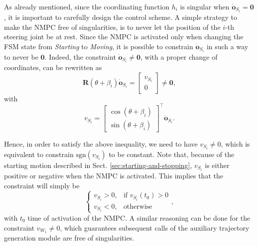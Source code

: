 As already mentioned, since the coordinating function $h_i$ is singular when $\dot{\bm{o}}_{S_i}=\bm{0}$, it is important to carefully design the control scheme. A simple strategy to make the NMPC free of singularities, is to never let the position of the $i$-th steering joint be at rest. Since the NMPC is activated only when changing the FSM state from \textit{Starting} to \textit{Moving}, it is possible to constrain $\dot{\bm{o}}_{S_i}$ in such a way to never be $\bm{0}$. Indeed, the constraint $\dot{\bm{o}}_{S_i} \ne \bm{0}$, with a proper change of coordinates, can be rewritten as
\begin{equation*}
    \bm{R}(\theta + \beta_i) \dot{\bm{o}}_{S_i} =
    \begin{bmatrix}
        v_{S_i} \\ 0
    \end{bmatrix} \ne \bm{0},
\end{equation*}
with
\begin{equation*}
    v_{S_i} = 
    \begin{bmatrix}
        \cos(\theta + \beta_i) \\
        \sin(\theta + \beta_i)
    \end{bmatrix}^\top \dot{\bm{o}}_{S_i}.
\end{equation*}

Hence, in order to satisfy the above inequality, we need to have $v_{S_i} \ne 0$, which is equivalent to constrain $\mathrm{sgn}(v_{S_i})$ to be constant. Note that, because of the starting motion described in Sect. \ref{sec:starting-and-stopping}, $v_{S_i}$ is either positive or negative when the NMPC is activated. This implies that the constraint will simply be
\begin{equation*}
\begin{cases}
    v_{S_i} > 0, & \text{if $v_{S_i}(t_0)>0$} \\
    v_{S_i} < 0, & \text{otherwise}
\end{cases},
\end{equation*}
with $t_0$ time of activation of the NMPC. A similar reasoning can be done for the constraint $v_{W_1} \ne 0$, which guarantees subsequent calls of the auxiliary trajectory generation module are free of singularities.

